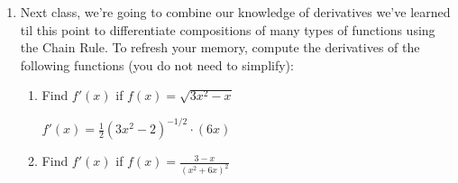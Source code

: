 \documentclass{article}
\begin{document}
\begin{enumerate}
\begin{enumerate}
    \begin{problem}[\vfill]
      According to this model, how quickly was the otter population changing in July 1993? Give an instantaneous rate of change; please simplify your answer, and include units.
    \end{problem}

    \begin{solution}
      We should find $P'(3)$ by first finding $P'(t)$. We can rewrite $P(t)$ as
      \begin{align*}
        P(t)&=\frac{300}{\sqrt{2}} 2^{t/6}\\ &= 
        \frac{300}{\sqrt{2}} (2^{1/6})^t
        \intertext{Now we can take the derivative.}
        P'(t) &= \frac{300}{\sqrt{2}} (\ln 2^{1/6})
        (2^{1/6})^t \\
        &= \frac{300}{\sqrt{2}}(\tfrac{1}{6}\ln 2)(2^{t/6}) \\
        &= \frac{50\ln 2}{\sqrt{2}}2^{t/6}
        \intertext{So $P'(3)$ is}
        P'(3) &= \frac{50\ln 2}{\sqrt{2}} 2^{1/2} \\
        &= \boxed{50 \ln 2\text{ otters per year}}
      \end{align*}
    \end{solution}

  \end{enumerate}

\item 
\begin{problem}
    Next class, we're going to combine our knowledge of derivatives we've learned til this point to differentiate compositions of many types of functions using the Chain Rule. To refresh your memory, compute the derivatives of the following functions (you do not need to simplify):
\end{problem}
\begin{enumerate}
    \item 
    \begin{problem}[\vfill]
    Find $f'(x)$ if $\displaystyle f(x) = \sqrt{3x^2-x}$\\
    \end{problem}
    \begin{solution}
        $\displaystyle f'(x) = \frac{1}{2}(3x^2-2)^{-1/2}\cdot (6x)$
    \end{solution}

    \item 
    \begin{problem}[\vfill]
        Find $f'(x)$ if $\displaystyle f(x) = \frac{3-x}{(x^2+6x)^2}$\\
        

\end{problem}
\end{enumerate}
\end{enumerate}
\end{document}
